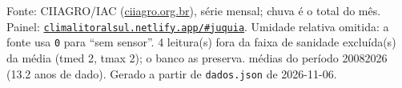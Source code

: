 \documentclass[10pt,a4paper]{article}
\begin{document}
\vspace{1pt}
{\tiny\color{cinza}
Fonte: CIIAGRO/IAC (\href{http://ciiagro.org.br}{ciiagro.org.br}), série mensal;
chuva é o total do mês. Painel:
\href{https://climalitoralsul.netlify.app/\#juquia}%
{\texttt{climalitoralsul.netlify.app/\#juquia}}.
Umidade relativa omitida: a fonte usa \texttt{0} para ``sem sensor''.  4 leitura(s) fora da faixa de sanidade excluída(s) da média (tmed 2, tmax 2); o banco as preserva.
médias do período 2008\textendash{}2026 (13.2 anos de dado).
Gerado a partir de \texttt{dados.json} de 2026-11-06.}
\end{document}
